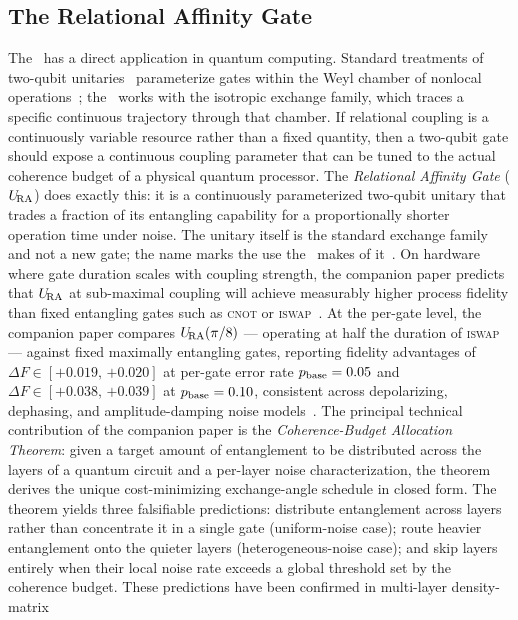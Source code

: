 \subsection{The Relational Affinity Gate}

The \RCF\ has a direct application in quantum computing.
Standard treatments of two-qubit unitaries~\citep{NielsenChuang2000}
parameterize gates within the Weyl chamber of nonlocal
operations~\citep{Zhang2003WeylChamber}; the \RCF\ works with the
isotropic exchange family, which traces a specific continuous trajectory
through that chamber.
If relational coupling is a continuously variable resource rather than
a fixed quantity, then a two-qubit gate should expose a continuous
coupling parameter that can be tuned to the actual coherence budget of
a physical quantum processor.
The \emph{Relational Affinity Gate} ($U_{\!\mathrm{RA}}$) does exactly this: it is a
continuously parameterized two-qubit unitary that trades a fraction of
its entangling capability for a proportionally shorter operation time
under noise.
The unitary itself is the standard exchange family and not a new gate;
the name marks the use the \RCF\ makes of it~\citep{Adams2026Physics}.
On hardware where gate duration scales with coupling strength, the
companion paper predicts that $U_{\!\mathrm{RA}}$ at sub-maximal coupling will
achieve measurably higher process fidelity than fixed entangling gates
such as \textsc{cnot} or \textsc{iswap}~\citep{Adams2026Physics}.
At the per-gate level, the companion paper compares $U_{\!\mathrm{RA}}(\pi/8)$ ---
operating at half the duration of \textsc{iswap} --- against fixed
maximally entangling gates, reporting fidelity advantages of
$\Delta F \in [{+0.019},\,{+0.020}]$ at per-gate error rate
$p_{\rm base} = 0.05$ and $\Delta F \in [{+0.038},\,{+0.039}]$ at
$p_{\rm base} = 0.10$, consistent across depolarizing, dephasing, and
amplitude-damping noise models~\citep{Adams2026Physics}.
The principal technical contribution of the companion paper is the
\emph{Coherence-Budget Allocation Theorem}: given a target amount of
entanglement to be distributed across the layers of a quantum circuit
and a per-layer noise characterization, the theorem derives the unique
cost-minimizing exchange-angle schedule in closed form.
The theorem yields three falsifiable predictions: distribute
entanglement across layers rather than concentrate it in a single gate
(uniform-noise case); route heavier entanglement onto the quieter layers
(heterogeneous-noise case); and skip layers entirely when their local
noise rate exceeds a global threshold set by the coherence budget.
These predictions have been confirmed in multi-layer density-matrix
